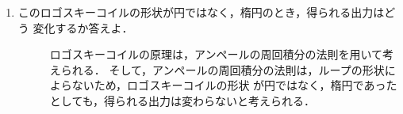 \begin{enumerate}
    \item このロゴスキーコイルの形状が円ではなく，楕円のとき，得られる出力はどう
    変化するか答えよ．
    \begin{description}
        \item[] ロゴスキーコイルの原理は，アンペールの周回積分の法則を用いて考えられる．
        そして，アンペールの周回積分の法則は，ループの形状によらないため，ロゴスキーコイルの形状
        が円ではなく，楕円であったとしても，得られる出力は変わらないと考えられる．
    \end{description}
\end{enumerate}